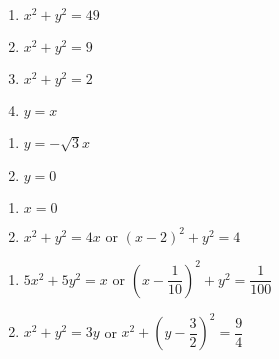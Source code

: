 \documentclass{ximera}
\begin{document}
\begin{multicols}{4}

\begin{enumerate}

\setcounter{enumi}{\value{HW}}

\item $x^{2} + y^{2} = 49$
\item $x^{2} + y^{2} = 9$
\item $x^{2} + y^{2} = 2$
\item $y=x$

\setcounter{HW}{\value{enumi}}

\end{enumerate}

\end{multicols}

\begin{multicols}{2}

\begin{enumerate}

\setcounter{enumi}{\value{HW}}

\item $y = -\sqrt{3}x$
\item $y=0$

\setcounter{HW}{\value{enumi}}

\end{enumerate}

\end{multicols}

\begin{multicols}{2}

\begin{enumerate}

\setcounter{enumi}{\value{HW}}

\item $x=0$
\item  $x^2 + y^2 = 4x$ or $(x-2)^2 + y^2 = 4$

\setcounter{HW}{\value{enumi}}

\end{enumerate}

\end{multicols}

\begin{multicols}{2}

\begin{enumerate}

\setcounter{enumi}{\value{HW}}

\item $5x^2 + 5y^2 = x$ or $\left(x - \dfrac{1}{10}\right)^2+y^2 = \dfrac{1}{100}$
\item $x^2 + y^2  = 3y$ or $x^2 + \left(y - \dfrac{3}{2}\right)^2 = \dfrac{9}{4}$

\setcounter{HW}{\value{enumi}}

\end{enumerate}

\end{multicols}
\end{document}
